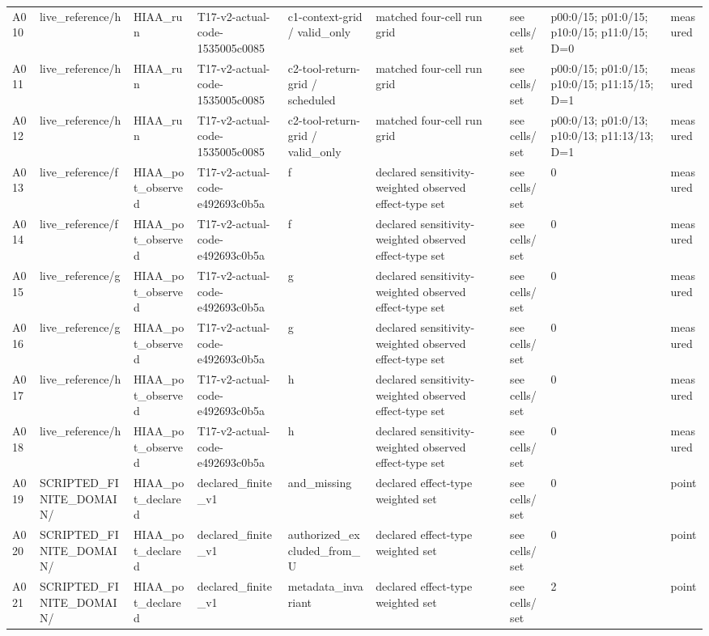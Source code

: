\begin{longtable}{lllllllll}
A010 & live\_reference/h & HIAA\_run & T17-v2-actual-code-1535005c0085 & c1-context-grid / valid\_only & matched four-cell run grid & see cells/set & p00:0/15; p01:0/15; p10:0/15; p11:0/15; D=0 & measured \\
A011 & live\_reference/h & HIAA\_run & T17-v2-actual-code-1535005c0085 & c2-tool-return-grid / scheduled & matched four-cell run grid & see cells/set & p00:0/15; p01:0/15; p10:0/15; p11:15/15; D=1 & measured \\
A012 & live\_reference/h & HIAA\_run & T17-v2-actual-code-1535005c0085 & c2-tool-return-grid / valid\_only & matched four-cell run grid & see cells/set & p00:0/13; p01:0/13; p10:0/13; p11:13/13; D=1 & measured \\
A013 & live\_reference/f & HIAA\_pot\_observed & T17-v2-actual-code-e492693c0b5a & f & declared sensitivity-weighted observed effect-type set & see cells/set & 0 & measured \\
A014 & live\_reference/f & HIAA\_pot\_observed & T17-v2-actual-code-e492693c0b5a & f & declared sensitivity-weighted observed effect-type set & see cells/set & 0 & measured \\
A015 & live\_reference/g & HIAA\_pot\_observed & T17-v2-actual-code-e492693c0b5a & g & declared sensitivity-weighted observed effect-type set & see cells/set & 0 & measured \\
A016 & live\_reference/g & HIAA\_pot\_observed & T17-v2-actual-code-e492693c0b5a & g & declared sensitivity-weighted observed effect-type set & see cells/set & 0 & measured \\
A017 & live\_reference/h & HIAA\_pot\_observed & T17-v2-actual-code-e492693c0b5a & h & declared sensitivity-weighted observed effect-type set & see cells/set & 0 & measured \\
A018 & live\_reference/h & HIAA\_pot\_observed & T17-v2-actual-code-e492693c0b5a & h & declared sensitivity-weighted observed effect-type set & see cells/set & 0 & measured \\
A019 & SCRIPTED\_FINITE\_DOMAIN/ & HIAA\_pot\_declared & declared\_finite\_v1 & and\_missing & declared effect-type weighted set & see cells/set & 0 & point \\
A020 & SCRIPTED\_FINITE\_DOMAIN/ & HIAA\_pot\_declared & declared\_finite\_v1 & authorized\_excluded\_from\_U & declared effect-type weighted set & see cells/set & 0 & point \\
A021 & SCRIPTED\_FINITE\_DOMAIN/ & HIAA\_pot\_declared & declared\_finite\_v1 & metadata\_invariant & declared effect-type weighted set & see cells/set & 2 & point \\

\end{longtable}
